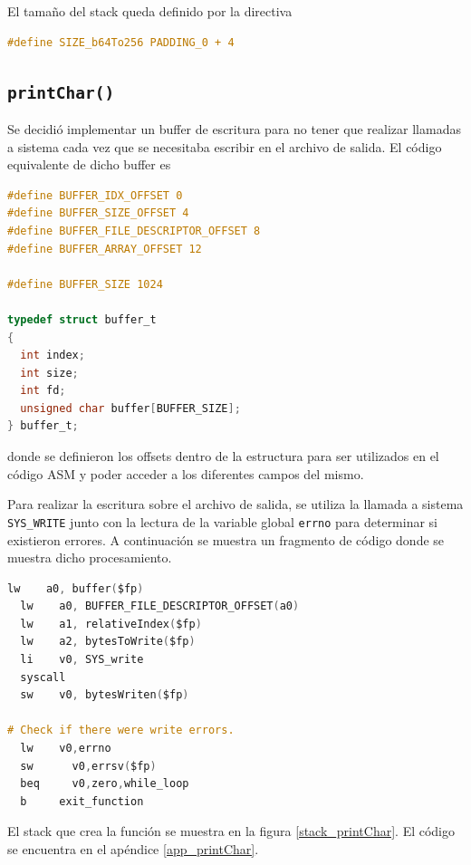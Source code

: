 El tamaño del stack queda definido por la directiva
\begin{lstlisting}[language=C, style=StyleC]
#define SIZE_b64To256 PADDING_0 + 4
\end{lstlisting}	

\subsection{\texttt{printChar()}}

Se decidió implementar un buffer de escritura para no tener que realizar llamadas a sistema cada vez que se necesitaba escribir en el archivo de salida. El código equivalente de dicho buffer es
\begin{lstlisting}[language=C, style=StyleC]
#define BUFFER_IDX_OFFSET 0
#define BUFFER_SIZE_OFFSET 4
#define BUFFER_FILE_DESCRIPTOR_OFFSET 8
#define BUFFER_ARRAY_OFFSET 12

#define BUFFER_SIZE 1024

typedef struct buffer_t
{
  int index;
  int size;
  int fd;
  unsigned char buffer[BUFFER_SIZE];
} buffer_t;
\end{lstlisting}
donde se definieron los offsets dentro de la estructura para ser utilizados en el código ASM y poder acceder a los diferentes campos del mismo.

Para realizar la escritura sobre el archivo de salida, se utiliza la llamada a sistema \texttt{SYS\_WRITE} junto con la lectura de la variable global \texttt{errno} para determinar si existieron errores. A continuación se muestra un fragmento de código donde se muestra dicho procesamiento.
\begin{lstlisting}[language=C, style=StyleC]
  lw    a0, buffer($fp)
  lw    a0, BUFFER_FILE_DESCRIPTOR_OFFSET(a0)
  lw    a1, relativeIndex($fp)
  lw    a2, bytesToWrite($fp)
  li    v0, SYS_write
  syscall
  sw    v0, bytesWriten($fp)

# Check if there were write errors.
  lw    v0,errno
  sw	  v0,errsv($fp)
  beq	  v0,zero,while_loop
  b     exit_function
\end{lstlisting}


El stack que crea la función se muestra en la figura \ref{stack_printChar}. El código se encuentra en el apéndice \ref{app_printChar}.

